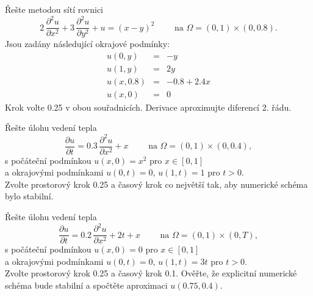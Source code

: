 \documentclass[a4paper,10pt]{book}
\begin{document}
\exercise \label{ex:pde2} Řešte metodou sítí rovnici 
\begin{equation*}
2\,\frac{\partial^2 u}{\partial x^2} + 3\,\frac{\partial^2 u}{\partial y^2} + u = (x-y)^2 \qquad \textrm{ na } \Omega=(0,1)\times(0,0.8).
\end{equation*}
Jsou zadány následující okrajové podmínky:
\begin{eqnarray*}
u(0,y) &=& -y \\
u(1,y) &=& 2y \\
u(x,0.8) &=& -0.8 + 2.4x \\
u(x,0) &=& 0
\end{eqnarray*}
Krok volte 0.25 v obou souřadnicích. Derivace aproximujte diferencí 2. řádu.

\exercise \label{ex:pde3} Řešte úlohu vedení tepla
\begin{equation*}
\frac{\partial u}{\partial t} = 0.3\,\frac{\partial^2 u}{\partial x^2} +x \qquad \textrm{ na } \Omega=(0,1)\times(0,0.4),
\end{equation*}
s počáteční podmínkou $u(x,0) = x^2$ pro $x\in [0,1]$ \\
a okrajovými podmínkami $u(0,t) = 0$, $u(1,t)=1$ pro $t>0$. \\
Zvolte prostorový krok 0.25 a časový krok co největší tak, aby numerické schéma bylo stabilní.

\exercise \label{ex:pde4} Řešte úlohu vedení tepla
\begin{equation*}
\frac{\partial u}{\partial t} = 0.2\,\frac{\partial^2 u}{\partial x^2} + 2t +x \qquad \textrm{ na } \Omega=(0,1)\times(0,T),
\end{equation*}
s počáteční podmínkou $u(x,0) = 0$ pro $x\in [0,1]$ \\
a okrajovými podmínkami $u(0,t) = 0$, $u(1,t)=3t$ pro $t>0$. \\
Zvolte prostorový krok 0.25 a časový krok 0.1. Ověřte, že explicitní numerické schéma bude stabilní a spočtěte aproximaci $u(0.75,0.4)$.
\end{document}
